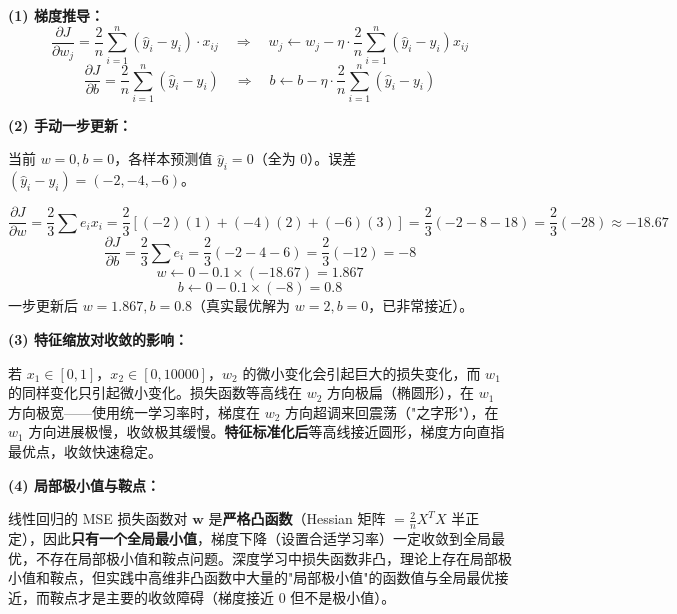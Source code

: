\documentclass[a4paper,11pt]{ctexart}
\begin{document}
\begin{solutionbox}[参考答案与详细解析]
    \textbf{(1) 梯度推导：}
    \[
    \frac{\partial J}{\partial w_j} = \frac{2}{n}\sum_{i=1}^n(\hat{y}_i - y_i)\cdot x_{ij}
    \quad \Rightarrow \quad
    w_j \leftarrow w_j - \eta\cdot\frac{2}{n}\sum_{i=1}^n(\hat{y}_i - y_i) x_{ij}
    \]
    \[
    \frac{\partial J}{\partial b} = \frac{2}{n}\sum_{i=1}^n(\hat{y}_i - y_i)
    \quad \Rightarrow \quad
    b \leftarrow b - \eta\cdot\frac{2}{n}\sum_{i=1}^n(\hat{y}_i - y_i)
    \]

    \textbf{(2) 手动一步更新：}

    当前 $w=0, b=0$，各样本预测值 $\hat{y}_i = 0$（全为 0）。误差 $(\hat{y}_i - y_i) = (-2, -4, -6)$。

    \[
    \frac{\partial J}{\partial w} = \frac{2}{3}\sum e_i x_i = \frac{2}{3}[(-2)(1)+(-4)(2)+(-6)(3)] = \frac{2}{3}(-2-8-18) = \frac{2}{3}(-28) \approx -18.67
    \]
    \[
    \frac{\partial J}{\partial b} = \frac{2}{3}\sum e_i = \frac{2}{3}(-2-4-6) = \frac{2}{3}(-12) = -8
    \]
    \[
    w \leftarrow 0 - 0.1\times(-18.67) = 1.867
    \]
    \[
    b \leftarrow 0 - 0.1\times(-8) = 0.8
    \]
    一步更新后 $w=1.867, b=0.8$（真实最优解为 $w=2, b=0$，已非常接近）。

    \textbf{(3) 特征缩放对收敛的影响：}

    若 $x_1\in[0,1]$，$x_2\in[0,10000]$，$w_2$ 的微小变化会引起巨大的损失变化，而 $w_1$ 的同样变化只引起微小变化。损失函数等高线在 $w_2$ 方向极扁（椭圆形），在 $w_1$ 方向极宽——使用统一学习率时，梯度在 $w_2$ 方向超调来回震荡（"之字形"），在 $w_1$ 方向进展极慢，收敛极其缓慢。\textbf{特征标准化后}等高线接近圆形，梯度方向直指最优点，收敛快速稳定。

    \textbf{(4) 局部极小值与鞍点：}

    \begin{keybox}[线性回归的凸性保证]
        线性回归的 MSE 损失函数对 $\boldsymbol{w}$ 是\textbf{严格凸函数}（Hessian 矩阵 $= \frac{2}{n}X^TX$ 半正定），因此\textbf{只有一个全局最小值}，梯度下降（设置合适学习率）一定收敛到全局最优，不存在局部极小值和鞍点问题。深度学习中损失函数非凸，理论上存在局部极小值和鞍点，但实践中高维非凸函数中大量的"局部极小值"的函数值与全局最优接近，而鞍点才是主要的收敛障碍（梯度接近 0 但不是极小值）。
    \end{keybox}
\end{solutionbox}
\end{document}
